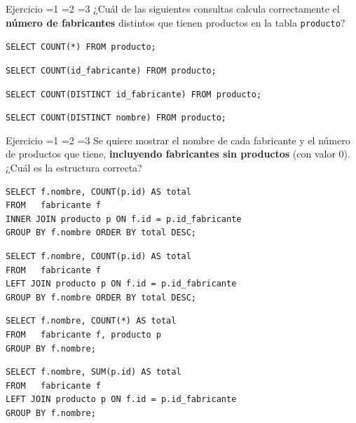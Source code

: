 \documentclass[12pt, a4paper]{article}
\newcommand{\estrella}{{\color{Goldenrod}\faStarSolid}}
\newcommand{\estrellavacia}{{\color{gray!45}\faStarSolid}}
\newcommand{\nivel}[1]{%
  \ifnum#1=1\estrella\estrellavacia\estrellavacia\fi
  \ifnum#1=2\estrella\estrella\estrellavacia\fi
  \ifnum#1=3\estrella\estrella\estrella\fi
}
\newcounter{numej}
\newcommand{\ej}{\stepcounter{numej}\thenumej}
\begin{document}
\begin{ejercicio}{Ejercicio \ej}{\nivel{2}}
¿Cuál de las siguientes consultas calcula correctamente el
\textbf{número de fabricantes} distintos que tienen productos en la tabla
\texttt{producto}?

\begin{opciones}
  \item \lstinline|SELECT COUNT(*) FROM producto;|
  \item \lstinline|SELECT COUNT(id_fabricante) FROM producto;|
  \item \lstinline|SELECT COUNT(DISTINCT id_fabricante) FROM producto;|
  \item \lstinline|SELECT COUNT(DISTINCT nombre) FROM producto;|
\end{opciones}
\end{ejercicio}

\begin{ejercicio}{Ejercicio \ej}{\nivel{2}}
Se quiere mostrar el nombre de cada fabricante y el número de productos
que tiene, \textbf{incluyendo fabricantes sin productos} (con valor 0).
¿Cuál es la estructura correcta?

\begin{opciones}
  \item
\begin{lstlisting}
SELECT f.nombre, COUNT(p.id) AS total
FROM   fabricante f
INNER JOIN producto p ON f.id = p.id_fabricante
GROUP BY f.nombre ORDER BY total DESC;
\end{lstlisting}
  \item
\begin{lstlisting}
SELECT f.nombre, COUNT(p.id) AS total
FROM   fabricante f
LEFT JOIN producto p ON f.id = p.id_fabricante
GROUP BY f.nombre ORDER BY total DESC;
\end{lstlisting}
  \item
\begin{lstlisting}
SELECT f.nombre, COUNT(*) AS total
FROM   fabricante f, producto p
GROUP BY f.nombre;
\end{lstlisting}
  \item
\begin{lstlisting}
SELECT f.nombre, SUM(p.id) AS total
FROM   fabricante f
LEFT JOIN producto p ON f.id = p.id_fabricante
GROUP BY f.nombre;
\end{lstlisting}
\end{opciones}
\end{ejercicio}
\end{document}

